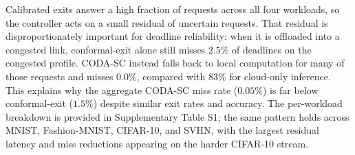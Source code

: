 \documentclass[11pt]{article}
\newcommand{\CodaPmiss}{0.05}
\newcommand{\ConfExitMiss}{1.5}
\newcommand{\CongCloudMiss}{83}
\newcommand{\CongConfMiss}{2.5}
\newcommand{\CongCodaMiss}{0.0}
\begin{document}
\begin{table}[t]
\centering
\caption{Headline metrics with 95\% confidence intervals (over
dataset$\times$seed$\times$profile cells) and paired Wilcoxon signed-rank
$p$-values versus CODA-SC.}
\label{tab:stats}
\end{table}

Calibrated exits answer a high fraction of requests across all four workloads,
so the controller acts on a small residual of uncertain requests. That residual
is disproportionately important for deadline reliability: when it is offloaded
into a congested link, conformal-exit alone still misses $\CongConfMiss\%$ of
deadlines on the congested profile. CODA-SC instead falls back to local
computation for many of those requests and misses $\CongCodaMiss\%$, compared
with $\CongCloudMiss\%$ for cloud-only inference. This explains why the aggregate
CODA-SC miss rate ($\CodaPmiss\%$) is far below conformal-exit
($\ConfExitMiss\%$) despite similar exit rates and accuracy. The per-workload
breakdown is provided in Supplementary Table S1; the same pattern holds across
MNIST, Fashion-MNIST, CIFAR-10, and SVHN, with the largest residual latency and
miss reductions appearing on the harder CIFAR-10 stream.
\end{document}

